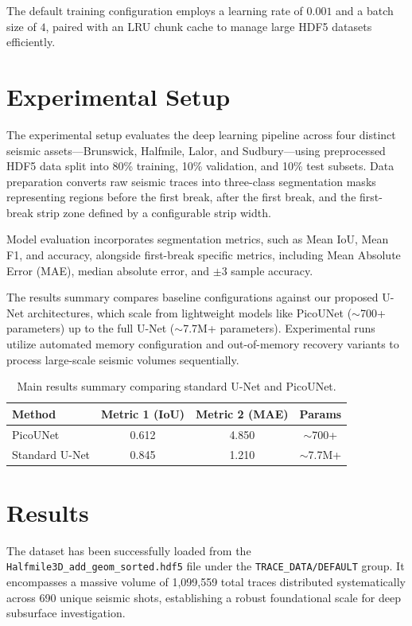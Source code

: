 \documentclass[conference]{IEEEtran}
\begin{document}
The default training configuration employs a learning rate of $0.001$ and a batch size of $4$, paired with an LRU chunk cache to manage large HDF5 datasets efficiently.

\section{Experimental Setup}
The experimental setup evaluates the deep learning pipeline across four distinct seismic assets---Brunswick, Halfmile, Lalor, and Sudbury---using preprocessed HDF5 data split into 80\% training, 10\% validation, and 10\% test subsets. Data preparation converts raw seismic traces into three-class segmentation masks representing regions before the first break, after the first break, and the first-break strip zone defined by a configurable strip width.

Model evaluation incorporates segmentation metrics, such as Mean IoU, Mean F1, and accuracy, alongside first-break specific metrics, including Mean Absolute Error (MAE), median absolute error, and $\pm 3$ sample accuracy.

The results summary compares baseline configurations against our proposed U-Net architectures, which scale from lightweight models like PicoUNet ($\sim$700+ parameters) up to the full U-Net ($\sim$7.7M+ parameters). Experimental runs utilize automated memory configuration and out-of-memory recovery variants to process large-scale seismic volumes sequentially.

\begin{table}[htbp]
\caption{Main results summary comparing standard U-Net and PicoUNet.}
\begin{center}
\begin{tabular}{|l|c|c|c|}
\hline
\textbf{Method} & \textbf{Metric 1 (IoU)} & \textbf{Metric 2 (MAE)} & \textbf{Params} \\ \hline
PicoUNet & 0.612 & 4.850 & $\sim$700+ \\ \hline
Standard U-Net & 0.845 & 1.210 & $\sim$7.7M+ \\ \hline
\end{tabular}
\label{tab:results}
\end{center}
\end{table}

\section{Results}
The dataset has been successfully loaded from the \texttt{Halfmile3D\_add\_geom\_sorted.hdf5} file under the \texttt{TRACE\_DATA/DEFAULT} group. It encompasses a massive volume of 1,099,559 total traces distributed systematically across 690 unique seismic shots, establishing a robust foundational scale for deep subsurface investigation.
\end{document}
